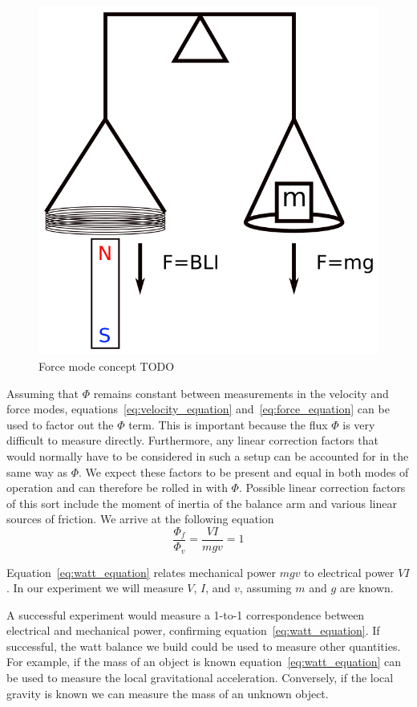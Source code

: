 \documentclass[aps,prstab,reprint,12pt]{revtex4-1}
\begin{document}
\begin{figure}[t]
    \centering
    \includegraphics[width=0.6\linewidth]{figs/watt-balance-fmode.png}
    \caption{Force mode concept TODO}
    \label{fig:fmode-concept}
\end{figure}

Assuming that $\Phi$ remains constant between measurements in the velocity and force modes, equations~\ref{eq:velocity_equation} and~\ref{eq:force_equation} can be used to factor out the $\Phi$ term. This is important because the flux $\Phi$ is very difficult to measure directly. Furthermore, any linear correction factors that would normally have to be considered in such a setup can be accounted for in the same way as $\Phi$. We expect these factors to be present and equal in both modes of operation and can therefore be rolled in with $\Phi$. Possible linear correction factors of this sort include the moment of inertia of the balance arm and various linear sources of friction. We arrive at the following equation
\begin{equation}\label{eq:watt_equation}
    \frac{\Phi_f}{\Phi_v} = \frac{VI}{mgv} = 1
\end{equation}

Equation~\ref{eq:watt_equation} relates mechanical power $mgv$ to electrical power $VI$. In our experiment we will measure $V$, $I$, and $v$, assuming $m$ and $g$ are known.

A successful experiment would measure a 1-to-1 correspondence between electrical and mechanical power, confirming equation~\ref{eq:watt_equation}. If successful, the watt balance we build could be used to measure other quantities. For example, if the mass of an object is known equation~\ref{eq:watt_equation} can be used to measure the local gravitational acceleration. Conversely, if the local gravity is known we can measure the mass of an unknown object.
\end{document}
